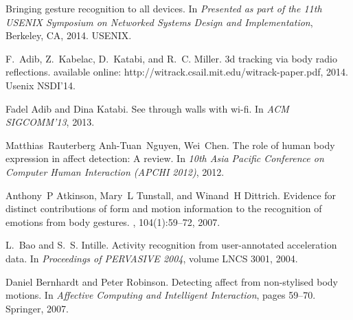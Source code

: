 \documentclass[12pt]{article}
\begin{document}

%
%
% 
% 
\begin{small}
\begin{thebibliography}{10}

Bringing gesture recognition to all devices.
\newblock In {\em Presented as part of the 11th USENIX Symposium on Networked
  Systems Design and Implementation}, Berkeley, CA, 2014. USENIX.

F.~Adib, Z.~Kabelac, D.~Katabi, and R.~C. Miller.
\newblock 3d tracking via body radio reflections.
\newblock available online: http://witrack.csail.mit.edu/witrack-paper.pdf,
  2014.
\newblock Usenix NSDI’14.

Fadel Adib and Dina Katabi.
\newblock See through walls with wi-fi.
\newblock In {\em ACM SIGCOMM'13}, 2013.

Matthias~Rauterberg Anh-Tuan~Nguyen, Wei~Chen.
\newblock The role of human body expression in affect detection: A review.
\newblock In {\em 10th Asia Pacific Conference on Computer Human Interaction
  (APCHI 2012)}, 2012.

Anthony~P Atkinson, Mary~L Tunstall, and Winand~H Dittrich.
\newblock Evidence for distinct contributions of form and motion information to
  the recognition of emotions from body gestures.
, 104(1):59--72, 2007.

L.~Bao and S.~S. Intille.
\newblock Activity recognition from user-annotated acceleration data.
\newblock In {\em Proceedings of PERVASIVE 2004}, volume LNCS 3001, 2004.

Daniel Bernhardt and Peter Robinson.
\newblock Detecting affect from non-stylised body motions.
\newblock In {\em Affective Computing and Intelligent Interaction}, pages
  59--70. Springer, 2007.


\end{thebibliography}
\end{small}
\end{document}
